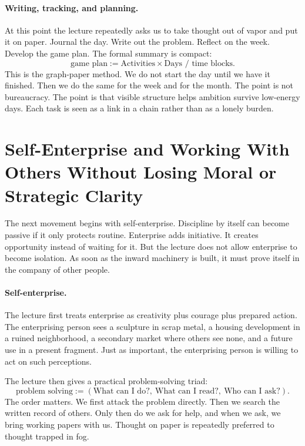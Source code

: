 \paragraph{Writing, tracking, and planning.}
At this point the lecture repeatedly asks us to take thought out of vapor and put it on paper. Journal the day. Write out the problem. Reflect on the week. Develop the game plan. The formal summary is compact:
\begin{equation}
\text{game plan} := \text{Activities} \times \text{Days / time blocks}.
\end{equation}
This is the graph-paper method. We do not start the day until we have it finished. Then we do the same for the week and for the month. The point is not bureaucracy. The point is that visible structure helps ambition survive low-energy days. Each task is seen as a link in a chain rather than as a lonely burden.

\section{Self-Enterprise and Working With Others Without Losing Moral or Strategic Clarity}

The next movement begins with self-enterprise. Discipline by itself can become passive if it only protects routine. Enterprise adds initiative. It creates opportunity instead of waiting for it. But the lecture does not allow enterprise to become isolation. As soon as the inward machinery is built, it must prove itself in the company of other people.

\paragraph{Self-enterprise.}
The lecture first treats enterprise as creativity plus courage plus prepared action. The enterprising person sees a sculpture in scrap metal, a housing development in a ruined neighborhood, a secondary market where others see none, and a future use in a present fragment. Just as important, the enterprising person is willing to act on such perceptions.

The lecture then gives a practical problem-solving triad:
\begin{equation}
\text{problem solving} := (\text{What can I do?},\ \text{What can I read?},\ \text{Who can I ask?}).
\end{equation}
The order matters. We first attack the problem directly. Then we search the written record of others. Only then do we ask for help, and when we ask, we bring working papers with us. Thought on paper is repeatedly preferred to thought trapped in fog.

